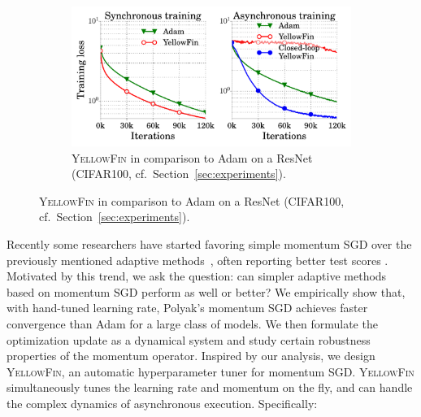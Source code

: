 \documentclass{article} %
\newcommand{\tuner}{\textsc{YellowFin}\xspace}
\begin{document}
\begin{figure}
\vspace{-2.4em}
\begin{minipage}{1.0\linewidth}
\begin{figure}[H]
	\includegraphics[width=\linewidth]{experiment_results/spotlight.pdf}
	\caption{\tuner in comparison to Adam on a ResNet (CIFAR100, cf.\ Section~\ref{sec:experiments}).	
	}
	\label{fig:spotlight}
\end{figure}
\end{minipage}
\end{figure}
Recently some researchers
 have started favoring simple momentum SGD over the previously mentioned adaptive methods~\citep{chen2016thorough,gehring2017convolutional}, often reporting better test scores \citep{wilson2017marginal}.
Motivated by this trend, we ask the question:
can simpler adaptive methods based on momentum SGD perform as well or better?
We empirically show that, with hand-tuned learning rate, Polyak's momentum SGD achieves faster convergence than Adam for a large class of models.
We then formulate the optimization update as a dynamical system and study certain robustness properties of the momentum operator.
Inspired by our analysis, we design \tuner, an automatic hyperparameter tuner for momentum SGD.
\tuner simultaneously tunes the learning rate and momentum on the fly, and can handle the complex dynamics of asynchronous execution.
Specifically:
\end{document}

